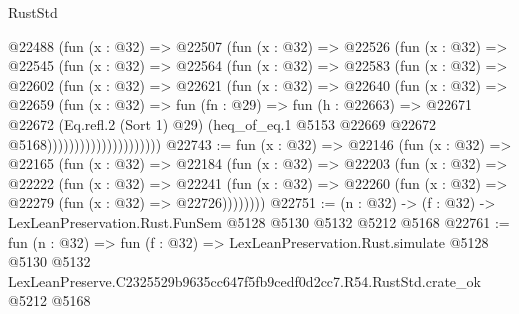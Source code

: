 \begin{lexlean}{RustStd}
\begin{coremodule}
                      @22488
                        (fun (x : @32) =>
                        @22507
                          (fun (x : @32) =>
                          @22526
                            (fun (x : @32) =>
                            @22545
                              (fun (x : @32) =>
                              @22564
                                (fun (x : @32) =>
                                @22583
                                  (fun (x : @32) =>
                                  @22602
                                    (fun (x : @32) =>
                                    @22621
                                      (fun (x : @32) =>
                                      @22640
                                        (fun (x : @32) =>
                                        @22659
                                          (fun (x : @32) =>
                                          fun (fn : @29) =>
                                          fun (h : @22663) =>
                                          @22671
                                            @22672
                                            (Eq.refl.{2} (Sort 1) @29)
                                            (heq_of_eq.{1}
                                              @5153
                                              @22669
                                              @22672
                                              @5168)))))))))))))))))))))
@22743 := fun (x : @32) =>
  @22146
    (fun (x : @32) =>
    @22165
      (fun (x : @32) =>
      @22184
        (fun (x : @32) =>
        @22203
          (fun (x : @32) =>
          @22222
            (fun (x : @32) =>
            @22241
              (fun (x : @32) => @22260 (fun (x : @32) => @22279 (fun (x : @32) => @22726))))))))
@22751 := (n : @32) -> (f : @32) -> LexLeanPreservation.Rust.FunSem @5128 @5130 @5132 @5212 @5168
@22761 := fun (n : @32) =>
  fun (f : @32) =>
  LexLeanPreservation.Rust.simulate
    @5128
    @5130
    @5132
    LexLeanPreserve.C2325529b9635cc647f5fb9cedf0d2cc7.R54.RustStd.crate_ok
    @5212
    @5168
\end{coremodule}
\end{lexlean}
